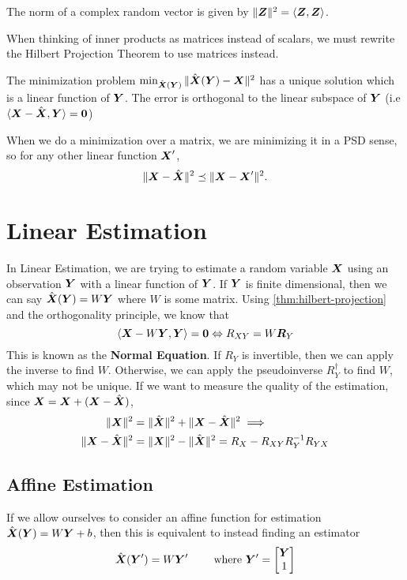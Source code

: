 \begin{definition}
	The norm of a complex random vector is given by $\|\boldsymbol{Z}\|^2 = \langle \boldsymbol{Z}, \boldsymbol{Z} \rangle$.
	\label{defn:norm}
\end{definition}
When thinking of inner products as matrices instead of scalars, we must rewrite the Hilbert Projection Theorem to use matrices instead.
\begin{theorem}
	The minimization problem $\min_{\hat{\boldsymbol{X}}(\boldsymbol{Y})}\|\hat{\boldsymbol{X}}(\boldsymbol{Y}) - \boldsymbol{X}\|^2$ has a unique solution which is a linear function of $\boldsymbol{Y}$. The error is orthogonal to the linear subspace of $\boldsymbol{Y}$ (i.e $\langle \boldsymbol{X} - \hat{\boldsymbol{X}}, \boldsymbol{Y} \rangle = \boldsymbol{0}$)
	\label{thm:hilbert-projection}
\end{theorem}
When we do a minimization over a matrix, we are minimizing it in a PSD sense, so for any other linear function $\boldsymbol{X}'$, \[
	\|\boldsymbol{X}-\hat{\boldsymbol{X}}\|^2  \preceq \|\boldsymbol{X} - \boldsymbol{X}'\|^2.
\]
\section{Linear Estimation}
In Linear Estimation, we are trying to estimate a random variable $\boldsymbol{X}$ using an observation $\boldsymbol{Y}$ with a linear function of $\boldsymbol{Y}$.
If $\boldsymbol{Y}$ is finite dimensional, then we can say $\hat{\boldsymbol{X}}(\boldsymbol{Y}) = W\boldsymbol{Y}$ where $W$ is some matrix.
Using \cref{thm:hilbert-projection} and the orthogonality principle, we know that
\[
	\langle \boldsymbol{X}-W\boldsymbol{Y}, \boldsymbol{Y} \rangle = \boldsymbol{0} \Leftrightarrow R_{XY} = W\boldsymbol{R}_Y
\]
This is known as the \textbf{Normal Equation}.
If $R_Y$ is invertible, then we can apply the inverse to find $W$.
Otherwise, we can apply the pseudoinverse $R_Y^\dagger$ to find $W$, which may not be unique.
If we want to measure the quality of the estimation, since $\boldsymbol{X} = \boldsymbol{X}+(\boldsymbol{X}-\hat{\boldsymbol{X}})$,
\begin{align*}
	\|\boldsymbol{X}\|^2 &= \|\hat{\boldsymbol{X}}\|^2 + \|\boldsymbol{X} - \hat{\boldsymbol{X}}\|^2 \implies \\
	\|\boldsymbol{X}-\hat{\boldsymbol{X}}\|^2 &= \|\boldsymbol{X}\|^2 - \|\hat{\boldsymbol{X}}\|^2 = R_X - R_{XY}R_Y^{-1}R_{YX}
\end{align*}
\subsection{Affine Estimation}
If we allow ourselves to consider an affine function for estimation $\hat{\boldsymbol{X}}(\boldsymbol{Y}) = W\boldsymbol{Y}+b$, then this is equivalent to instead finding an estimator
\[
	\hat{\boldsymbol{X}}(\boldsymbol{Y}') = W\boldsymbol{Y}' \qquad \text{ where } \boldsymbol{Y}' = \begin{bmatrix} \boldsymbol{Y} \\ 1 \end{bmatrix}
\]

